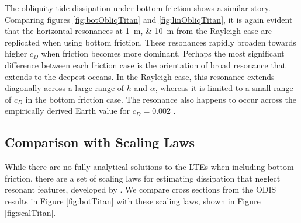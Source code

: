 The obliquity tide dissipation under bottom friction shows a similar story. Comparing figures \ref{fig:botObliqTitan} and \ref{fig:linObliqTitan}, it is again evident that the horizontal resonances at \SIlist{1;10}{\metre} from the Rayleigh case are replicated when using bottom friction. These resonances rapidly broaden towards higher $c_D$ when friction becomes more dominant. Perhaps the most significant difference between each friction case is the orientation of broad resonance that extends to the deepest oceans. In the Rayleigh case, this resonance extends diagonally across a large range of $h$ and $\alpha$, whereas it is limited to a small range of $c_D$ in the bottom friction case. The resonance also happens to occur across the empirically derived Earth value for $c_D = 0.002$ \citep[e.g.,][]{sohl1995tidal,egbert2001estimates}.

\subsection{Comparison with Scaling Laws \label{subsec:scalTitan}}

While there are no fully analytical solutions to the LTEs when including bottom friction, there are a set of scaling laws for estimating dissipation that neglect resonant features, developed by \citet{chen2013tidal}. We compare cross sections from the ODIS results in Figure \ref{fig:botTitan} with these scaling laws, shown in Figure \ref{fig:scalTitan}.

